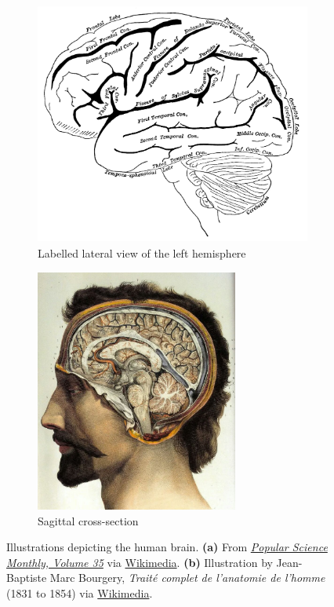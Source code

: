 \documentclass[10pt,letterpaper,oneside]{article}
\begin{document}
\begin{figure}
	\centering%
	\begin{subfigure}{0.575\textwidth}%
		\centering%
		\includegraphics[height=8cm]{media/psm_v35_d759_diagram_of_the_left_cerebral_hemisphere.jpg}%
		\caption{Labelled lateral view of the left hemisphere}%
		\label{fig:brain_lateral}%
	\end{subfigure}%
	\begin{subfigure}{0.425\textwidth}%
		\centering%
		\includegraphics[height=8cm]{media/jean_baptiste_marc_bourgery_atlas_of_anatomy_human_brain.jpg}%
		\caption{Sagittal cross-section}
		\label{fig:brain_sagittal}
	\end{subfigure}%
	\caption{Illustrations depicting the human brain. \textbf{(a)} From \href{https://archive.org/details/popularsciencemo35newyuoft/page/n6}{\emph{Popular Science Monthly, Volume 35}} via \href{https://commons.wikimedia.org/wiki/File:PSM_V35_D759_Diagram_of_the_left_cerebral_hemisphere.jpg}{Wikimedia}. \textbf{(b)} Illustration by Jean-Baptiste Marc Bourgery, \emph{Traité complet de l'anatomie de l'homme} (1831 to 1854) via \href{https://commons.wikimedia.org/wiki/File:Human_brain.jpg}{Wikimedia}.}
\end{figure}
\end{document}
